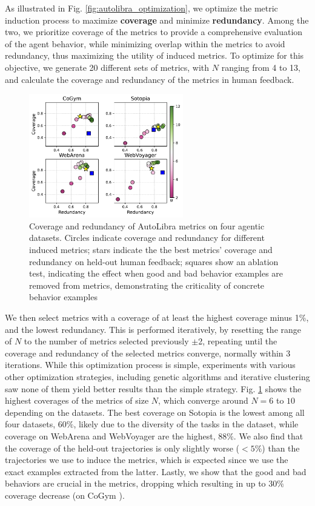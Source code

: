 As illustrated in Fig. \ref{fig:autolibra_optimization}, we optimize the metric
induction process to maximize \textbf{coverage} and minimize \textbf{redundancy}.
Among the two, we prioritize coverage of the metrics to provide a comprehensive
evaluation of the agent behavior, while minimizing overlap within the metrics to
avoid redundancy, thus maximizing the utility of induced metrics. To optimize for
this objective, we generate 20 different sets of metrics, with $N$ ranging from 4
to 13, and calculate the coverage and redundancy of the metrics in human
feedback.
\begin{figure}
	\vspace{-10pt}
	\includegraphics[width=0.6\textwidth]{figs/four_datasets_grid.pdf}
	\vspace{-15pt}
	\caption{Coverage and redundancy of AutoLibra metrics on four agentic datasets.
		Circles indicate coverage and redundancy for different induced metrics; stars
		indicate the the best metrics' coverage and redundancy on held-out human feedback;
		squares show an ablation test, indicating the effect when good and bad behavior
		examples are removed from metrics, demonstrating the criticality of concrete
		behavior examples}
	\label{fig:coverage-redundancy}
\end{figure}
We then select metrics with a coverage of at least the highest coverage minus 1\%,
and the lowest redundancy. This is performed iteratively, by resetting the range
of $N$ to the number of metrics selected previously $\pm$2, repeating until the coverage
and redundancy of the selected metrics converge, normally within 3 iterations. While
this optimization process is simple, experiments with various other optimization
strategies, including genetic algorithms and iterative clustering saw none of them
yield better results than the simple strategy. Fig. \ref{fig:coverage-redundancy}
shows the highest coverages of the metrics of size $N$, which converge around
$N=6$ to $10$ depending on the datasets. The best coverage on Sotopia \citep{zhousotopia}
is the lowest among all four datasets, $60\%$, likely due to the diversity of
the tasks in the dataset, while coverage on WebArena \citep{zhouwebarena} and
WebVoyager \citep{he2024webvoyager} are the highest, $88\%$. We also find that the
coverage of the held-out trajectories is only slightly worse ($<5\%$) than the trajectories
we use to induce the metrics, which is expected since we use the exact examples
extracted from the latter. Lastly, we show that the good and bad behaviors are
crucial in the metrics, dropping which resulting in up to $30\%$ coverage decrease
(on CoGym \citep{shao2024collaborative}).

